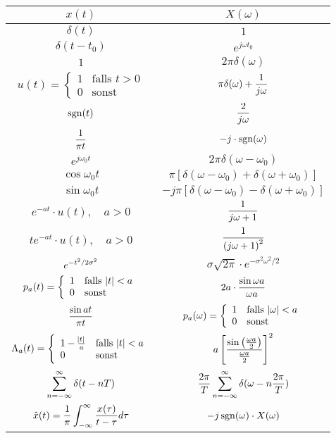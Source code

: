 \documentclass[a4paper]{article}
\begin{document}
\begin{twocolumn}
\begin{tabular}{cc}
  $x(t)$ & $X(\omega)$ \\
  \toprule 
  $\delta(t)$ & $1$ \\
  $\delta(t-t_0)$ & $e^{j \omega t_0}$ \\
  $1$ & $2 \pi \delta(\omega)$ \\
  $u(t) = \left\{ \begin{array}{ll} 1 & \text{falls } t > 0 \\ 0 & \text{sonst} \end{array} \right.$ & $\displaystyle \pi \delta(\omega) + \frac{1}{j\omega}$ \\
  $\operatorname{sgn}(t)$ & $\displaystyle \frac{2}{j\omega}$ \\
  $\displaystyle \frac{1}{\pi t}$ & $-j \cdot \operatorname{sgn}(\omega)$ \\
  $e^{j \omega_0 t}$ & $2 \pi \delta(\omega - \omega_0)$ \\
  $\cos \omega_0 t$ & $\pi \left[ \delta(\omega - \omega_0) + \delta(\omega + \omega_0) \right]$ \\
  $\sin \omega_0 t$ & $-j \pi \left[ \delta(\omega - \omega_0) - \delta(\omega + \omega_0) \right]$ \\
  $e^{-a t} \cdot u(t), \quad a > 0$ & $\displaystyle \frac{1}{j \omega + 1}$ \\
  $t e^{-a t} \cdot u(t), \quad a > 0$ & $\displaystyle \frac{1}{\left( j \omega + 1 \right)^2}$ \\
  $\displaystyle e^{-t^2 / 2\sigma^2 }$ & $\sigma \sqrt{2\pi} \cdot e^{-\sigma^2 \omega^2 / 2}$ \\
  $p_a(t) = \left\{ \begin{array}{ll} 1 & \text{falls } \abs{t} < a \\ 0 & \text{sonst} \end{array} \right.$ & $\displaystyle 2a \cdot \frac{\sin \omega a}{\omega a}$ \\
  $\displaystyle \frac{\sin at}{\pi t}$ & $p_a(\omega) = \left\{ \begin{array}{ll} 1 & \text{falls } \abs{\omega} < a \\ 0 & \text{sonst} \end{array} \right.$ \\
  $\Lambda_a(t) = \left\{ \begin{array}{ll} 1 - \frac{\abs{t}}{a} & \text{falls } \abs{t} < a
  \\ 0 & \text{sonst} \end{array} \right.$ & $\displaystyle a \left[ \frac{\sin \left(\frac{\omega a}{2}\right)}{\frac{\omega a}{2}} \right]^2$ \\
  $\displaystyle \sum_{n = -\infty}^{\infty} \delta(t - nT)$ & $\displaystyle \frac{2\pi}{T} \sum_{n = -\infty}^{\infty} \delta(\omega - n \frac{2\pi}{T})$ \\
  $\displaystyle \hat{x}(t) = \frac{1}{\pi} \int_{-\infty}^\infty \frac{x(\tau)}{t - \tau}d \tau$ & $-j \operatorname{sgn}(\omega) \cdot X(\omega)$ \\
\end{tabular}


\end{twocolumn}
\end{document}
